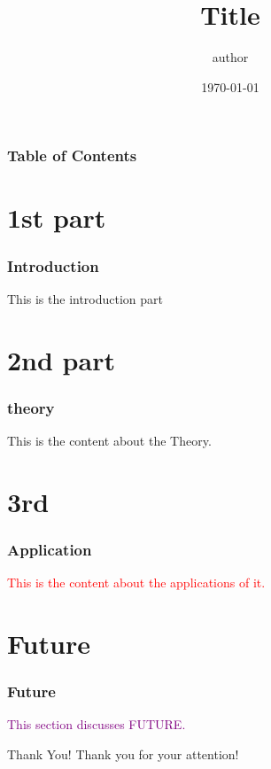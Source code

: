 \documentclass{beamer}
\title{\textbf{Title}}
\author{author}
\date{\today}
\begin{document}
\frame{\titlepage}

\begin{frame}
    \frametitle{\textbf{Table of Contents}}
    \tableofcontents %
\end{frame}

\section{1st part}
\begin{frame}
    \frametitle{\textbf{Introduction}} %
    This is the introduction part
\end{frame}

\section{2nd part}
\begin{frame}
    \frametitle{{\textbf{theory}}} %
    This is the content about the Theory.
\end{frame}

\section{3rd}
\begin{frame}
    \frametitle{\textbf{Application}} %
    \textcolor{red}{This is the content about the applications of it.} %
\end{frame}

\section{Future}
\begin{frame}
    \frametitle{\textbf{{Future}}} %
    \textcolor{purple}{
        This section discusses FUTURE.
    } %
\end{frame}

\begin{frame}{Thank You!}
    Thank you for your attention!
\end{frame}
\end{document}
